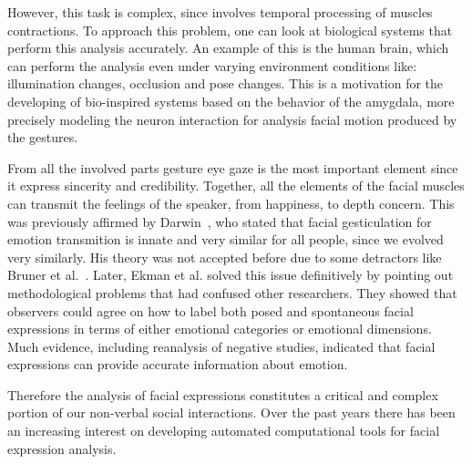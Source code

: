However, this task is complex, since involves temporal processing of muscles contractions. To approach this problem, one can look at biological systems that perform this analysis accurately. An example of this is the human brain, which can perform the analysis even under varying environment conditions like: illumination changes, occlusion and pose changes. This is a motivation for the developing of bio-inspired systems based on the behavior of the amygdala, more precisely modeling the neuron interaction for analysis facial motion produced by the gestures.

From all the involved parts gesture eye gaze is the most important element since it express sincerity and credibility. Together, all the elements of the facial muscles can transmit the feelings of the speaker, from happiness, to depth concern. This was previously affirmed by Darwin~\cite{Darwin1872}, who stated that facial gesticulation for emotion transmition is innate and very similar for all people, since we evolved very similarly. His theory was not accepted before due to some detractors like Bruner et al.~\cite{Bruner1954}. Later, Ekman et al. \cite{Hager1979} solved this issue definitively by pointing out methodological problems that had confused other researchers. They showed that observers could agree on how to label both posed and spontaneous facial expressions in terms of either emotional categories or emotional dimensions. Much evidence, including reanalysis of negative studies, indicated that facial expressions can provide accurate information about emotion.

Therefore the analysis of facial expressions constitutes a critical and complex portion of our non-verbal social interactions. Over the past years there has been an increasing interest on developing automated computational tools for facial expression analysis.

